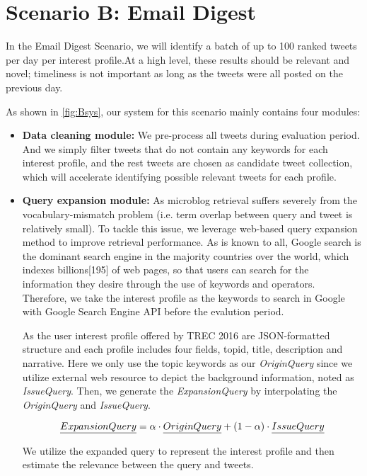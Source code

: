 \section{Scenario B: Email Digest}
In the Email Digest Scenario, we will identify a batch of up to 100 ranked tweets per day per interest profile.At a high level, these results should be relevant and novel; timeliness is not important as long as the tweets were all posted on the previous day.

As shown in \ref{fig:Bsys}, our system for this scenario mainly contains four modules:

\begin{itemize}
\item \textbf{Data cleaning module:} We pre-process all tweets during evaluation period. And we simply filter tweets that do not contain any keywords for each interest profile, and the rest tweets are chosen as candidate tweet collection, which will accelerate identifying possible relevant tweets for each profile.

\item \textbf{Query expansion module:} As microblog retrieval suffers severely from the
vocabulary-mismatch problem (i.e. term overlap between query and tweet is relatively small). To tackle this issue, we leverage web-based query expansion method to improve retrieval performance. As is known to all, Google search is the dominant search engine in the majority countries over the world, which indexes billions[195] of web pages, so that users can search for the information they desire through the use of keywords and operators. Therefore, we take the interest profile as the keywords to search in Google with Google Search Engine API before the evalution period.


As the user interest profile offered by TREC 2016 are JSON-formatted structure and each profile includes four fields, topid, title, description and narrative. Here we only use the topic keywords as our \emph{OriginQuery} since we utilize external web resource to depict the background information, noted as \emph{IssueQuery}. Then, we generate the \emph{ExpansionQuery} by interpolating the \emph{OriginQuery} and \emph{IssueQuery}.

\begin{equation}
\label{equ:merge}
\emph{ExpansionQuery} = \alpha \cdot \emph{OriginQuery} + (1-\alpha) \cdot \emph{IssueQuery}
\end{equation}

We utilize the expanded query to represent the interest profile and then estimate the relevance between the query and tweets.


\end{itemize}
